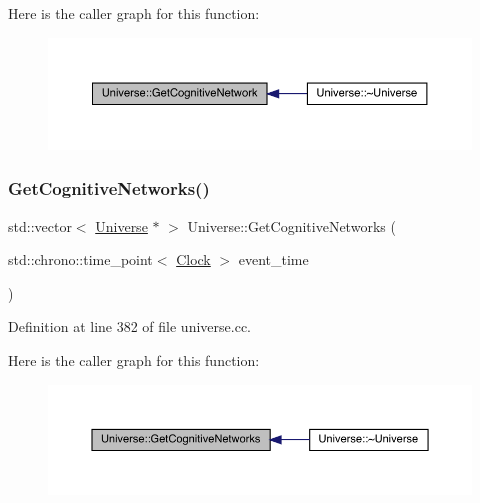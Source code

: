 Here is the caller graph for this function\+:
\nopagebreak
\begin{figure}[H]
\begin{center}
\leavevmode
\includegraphics[width=350pt]{class_universe_a1ea2b7e438bfdc7dd599aa59c310b126_icgraph}
\end{center}
\end{figure}
\mbox{\label{class_universe_a06968a24194280a43f077c5b77379ea8}} 
\subsubsection{\texorpdfstring{Get\+Cognitive\+Networks()}{GetCognitiveNetworks()}}
{\footnotesize\ttfamily std\+::vector$<$ \hyperlink{class_universe}{Universe} $\ast$ $>$ Universe\+::\+Get\+Cognitive\+Networks (\begin{DoxyParamCaption}\item[{std\+::chrono\+::time\+\_\+point$<$ \hyperlink{universe_8h_a0ef8d951d1ca5ab3cfaf7ab4c7a6fd80}{Clock} $>$}]{event\+\_\+time }\end{DoxyParamCaption})}



Definition at line 382 of file universe.\+cc.

Here is the caller graph for this function\+:
\nopagebreak
\begin{figure}[H]
\begin{center}
\leavevmode
\includegraphics[width=350pt]{class_universe_a06968a24194280a43f077c5b77379ea8_icgraph}
\end{center}
\end{figure}
\mbox{\label{class_universe_a3e2acc1d75765a6e8e852fca919c5b96}} 
